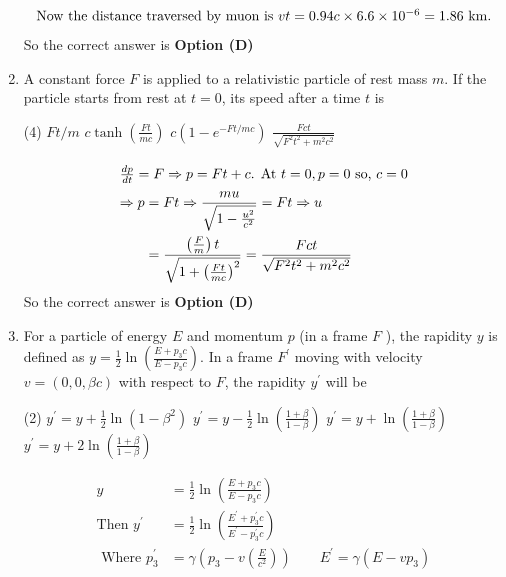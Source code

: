 \begin{enumerate}
\begin{answer}
\begin{align*}
\intertext{Now the distance traversed by muon is $v t=0.94 c \times 6.6 \times 10^{-6}=1.86 \mathrm{~km}$.}
\end{align*}
So the correct answer is \textbf{Option (D)}
\end{answer}
	\item A constant force $F$ is applied to a relativistic particle of rest mass $m$. If the particle starts from rest at $t=0$, its speed after a time $t$ is
{	}
\begin{tasks}(4)
\task[\textbf{A.}] $F t / m$
\task[\textbf{B.}] $c \tanh \left(\frac{F t}{m c}\right)$
\task[\textbf{C.}] $c\left(1-e^{-F t / m c}\right)$
\task[\textbf{D.}] $\frac{F c t}{\sqrt{F^{2} t^{2}+m^{2} c^{2}}}$
\end{tasks}
\begin{answer}
\begin{align*}
\intertext{$\frac{d p}{d t}=F \Rightarrow p=F t+c$. At $t=0, p=0$ so, $c=0$}
\Rightarrow p&=F t \Rightarrow \frac{m u}{\sqrt{1-\frac{u^{2}}{c^{2}}}}=F t \Rightarrow u\\&=\frac{\left(\frac{F}{m}\right) t}{\sqrt{1+\left(\frac{F t}{m c}\right)^{2}}}=\frac{F c t}{\sqrt{F^{2} t^{2}+m^{2} c^{2}}}
\end{align*}
So the correct answer is \textbf{Option (D)}
\end{answer}
	\item For a particle of energy $E$ and momentum $p$ (in a frame $F$ ), the rapidity $y$ is defined as $y=\frac{1}{2} \ln \left(\frac{E+p_{3} c}{E-p_{3} c}\right) .$ In a frame $F^{\prime}$ moving with velocity $v=(0,0, \beta c)$ with respect to $F$, the rapidity $y^{\prime}$ will be
{	}
\begin{tasks}(2)
\task[\textbf{A.}] $y^{\prime}=y+\frac{1}{2} \ln \left(1-\beta^{2}\right)$
\task[\textbf{B.}] $y^{\prime}=y-\frac{1}{2} \ln \left(\frac{1+\beta}{1-\beta}\right)$
\task[\textbf{C.}]  $y^{\prime}=y+\ln \left(\frac{1+\beta}{1-\beta}\right)$
\task[\textbf{D.}] $y^{\prime}=y+2 \ln \left(\frac{1+\beta}{1-\beta}\right)$
\end{tasks}
\begin{answer}
\begin{align*}
y&=\frac{1}{2} \ln \left(\frac{E+p_{3} c}{E-p_{3} c}\right)\\
\text{Then }y^{\prime}&=\frac{1}{2} \ln \left(\frac{E^{\prime}+p_{3}^{\prime} c}{E^{\prime}-p_{3}^{\prime} c}\right)\\
\text{	Where }p_{3}^{\prime}&=\gamma\left(p_{3}-v\left(\frac{E}{c^{2}}\right)\right) \quad \quad E^{\prime}=\gamma\left(E-v p_{3}\right)

\end{align*}
\end{answer}
\end{enumerate}
